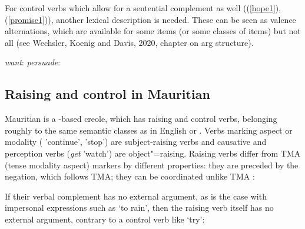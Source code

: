 \documentclass[output=paper
	        ,collection
	        ,collectionchapter
 	        ,biblatex
                ,babelshorthands
                ,newtxmath
                ,draftmode
                ,colorlinks, citecolor=brown
]{langscibook}
\begin{document}
For control verbs which allow for a sentential complement as well  ((\ref{hope1}), (\ref{promise1})), another lexical description is needed. These can be seen as valence alternations, which are available for some items (or some classes of items) but not all (see Wechsler, Koenig and Davis, 2020, chapter on arg structure).

\eal
\ex \emph{want}: 
\ex \emph{persuade}: 
\zl




\subsection{Raising and control in Mauritian} \label{sec-maurit}


Mauritian is a -based creole, which has raising and control verbs, belonging roughly to the same semantic classes as in English or . Verbs marking aspect or
modality ( 'continue',  'stop') are subject-raising verbs and causative and perception verbs (\emph{get} 'watch') are
object"=raising. Raising verbs differ from TMA (tense modality aspect) markers by different properties: they are preceded by
the negation, which follows TMA; they can be coordinated unlike TMA \citep[]{HenriandLaurens2011}:

\eal
{}
\zl
 
If their verbal complement has no external argument, as is the case with impersonal expressions such as  `to rain', then the raising verb itself has no external argument, contrary to a control verb like  `try':

\eal
{}
\zl
\end{document}
